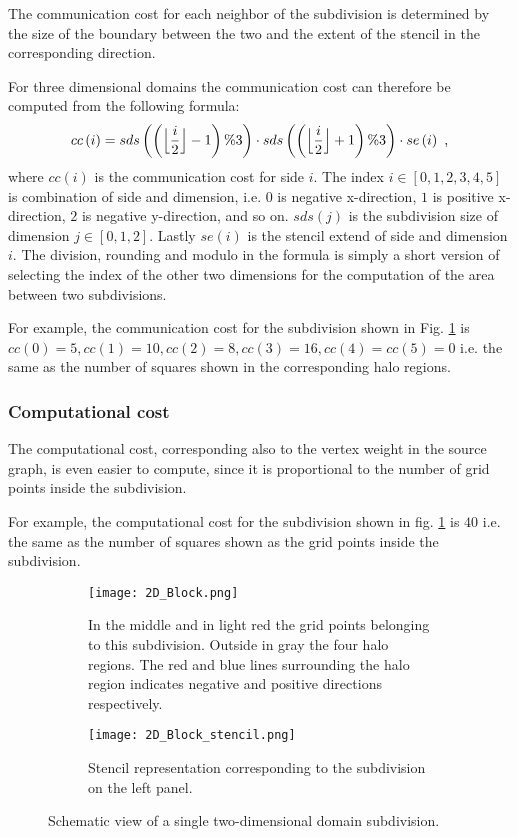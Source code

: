 The communication cost for each neighbor of the subdivision is determined by the size of the boundary between the two and the extent of the stencil in the corresponding direction.

For three dimensional domains the communication cost can therefore be computed from the following formula:
\begin{equation}
cc\left(i\right) = sds\left(\left(\floor[\Big]{\frac{i}{2}} - 1\right) \% 3 \right) \cdot sds\left(\left(\floor[\Big]{\frac{i}{2}} + 1\right) \% 3 \right) \cdot se\left(i\right) \text{ ,}
\end{equation}
where $cc\left(i\right)$ is the communication cost for side $i$.
The index $i \in \left[0, 1, 2, 3, 4, 5\right]$ is combination of side and dimension, i.e. $0$ is negative x-direction, $1$ is positive x-direction, $2$ is negative y-direction, and so on.
$sds\left(j\right)$ is the subdivision size of dimension $j \in \left[0,1,2\right]$.
Lastly $se\left(i\right)$ is the stencil extend of side and dimension $i$.
The division, rounding and modulo in the formula is simply a short version of selecting the index of the other two dimensions for the computation of the area between two subdivisions.

For example, the communication cost for the subdivision shown in Fig. \ref{fig:2DBlock} is $cc\left(0\right) = 5, cc\left(1\right) = 10, cc\left(2\right) = 8, cc\left(3\right) = 16, cc\left(4\right) = cc\left(5\right) = 0$ i.e. the same as the number of squares shown in the corresponding halo regions.

\subsubsection{Computational cost}
\label{sec:compcost}
The computational cost, corresponding also to the vertex weight in the source graph, is even easier to compute, since it is proportional to the number of grid points inside the subdivision.

For example, the computational cost for the subdivision shown in fig. \ref{fig:2DBlock} is $40$ i.e. the same as the number of squares shown as the grid points inside the subdivision.

\begin{figure}[!htbp]
\centering
\begin{subfigure}{0.8\textwidth}
  \centering
  \texttt{[image: 2D\_Block.png]}
  \caption{In the middle and in light red the grid points belonging to this subdivision.
Outside in gray the four halo regions.
The red and blue lines surrounding the halo region indicates negative and positive directions respectively.}
  \label{fig:2DBlock}
\end{subfigure}%
\begin{subfigure}{0.2\textwidth}
  \centering
  \texttt{[image: 2D\_Block\_stencil.png]}
  \caption{Stencil representation corresponding to the subdivision on the left panel.}
  \label{fig:2DBlockStencil}
\end{subfigure}
\caption{Schematic view of a single two-dimensional domain subdivision.}
\label{fig:2D_subdivision}
\end{figure}

